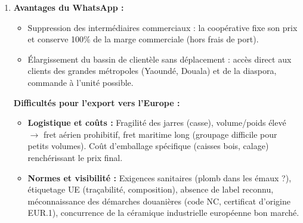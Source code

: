 \documentclass[11pt]{article}
\begin{document}
\begin{corrige}[Exercice 1]
\begin{enumerate}
\begin{center}
      \end{center}
      \textit{(Le croquis doit comporter un titre, une légende pour les couleurs bleu/vert, et l'orientation Nord si spatialisé).}
\item \textbf{Avantages du WhatsApp :}
      \begin{itemize}
      \item Suppression des intermédiaires commerciaux : la coopérative fixe son prix et conserve \num{100}\% de la marge commerciale (hors frais de port).
      \item Élargissement du bassin de clientèle sans déplacement : accès direct aux clients des grandes métropoles (Yaoundé, Douala) et de la diaspora, commande à l'unité possible.
      \end{itemize}
      \textbf{Difficultés pour l'export vers l'Europe :}
      \begin{itemize}
      \item \textbf{Logistique et coûts :} Fragilité des jarres (casse), volume/poids élevé $\rightarrow$ fret aérien prohibitif, fret maritime long (groupage difficile pour petits volumes). Coût d'emballage spécifique (caisses bois, calage) renchérissant le prix final.
      \item \textbf{Normes et visibilité :} Exigences sanitaires (plomb dans les émaux ?), étiquetage \textsc{UE} (traçabilité, composition), absence de label reconnu, méconnaissance des démarches douanières (code NC, certificat d'origine EUR.1), concurrence de la céramique industrielle européenne bon marché.
      \end{itemize}
\end{enumerate}
\end{corrige}
\end{document}
